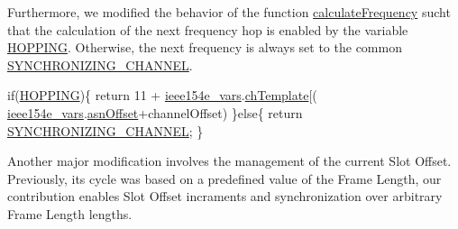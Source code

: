  Furthermore, we modified the behavior of the function \hyperlink{_i_e_e_e802154_e_8c_a01c55569f4f1aadf1d4a156b08014e50}{calculate\+Frequency} sucht that the calculation of the next frequency hop is enabled by the variable \hyperlink{group___i_e_e_e802154_e_ga495914ac755e3089a99e6a6946c12971}{H\+O\+P\+P\+I\+NG}. Otherwise, the next frequency is always set to the common \hyperlink{group___i_e_e_e802154_e_gaf8be83417584fa06ecb6982f183bd222}{S\+Y\+N\+C\+H\+R\+O\+N\+I\+Z\+I\+N\+G\+\_\+\+C\+H\+A\+N\+N\+EL}.


\begin{DoxyCodeInclude}
    \textcolor{keywordflow}{if}(\hyperlink{group___i_e_e_e802154_e_ga495914ac755e3089a99e6a6946c12971}{HOPPING})\{
        \textcolor{keywordflow}{return} 11 + \hyperlink{_i_e_e_e802154_e_8c_abbfc7f36c7b2d2635f4407908445a89b}{ieee154e\_vars}.\hyperlink{structieee154e__vars__t_a8ea426fa464ed96aeb12f16c2985171d}{chTemplate}[(
      \hyperlink{_i_e_e_e802154_e_8c_abbfc7f36c7b2d2635f4407908445a89b}{ieee154e\_vars}.\hyperlink{structieee154e__vars__t_acd689febb1e54412f6faff6a6db0b5c9}{asnOffset}+channelOffset)%
    \}\textcolor{keywordflow}{else}\{
        \textcolor{keywordflow}{return} \hyperlink{group___i_e_e_e802154_e_gaf8be83417584fa06ecb6982f183bd222}{SYNCHRONIZING\_CHANNEL};
    \}
\end{DoxyCodeInclude}


Another major modification involves the management of the current Slot Offset. Previously, its cycle was based on a predefined value of the Frame Length, our contribution enables Slot Offset incraments and synchronization over arbitrary Frame Length lengths.

